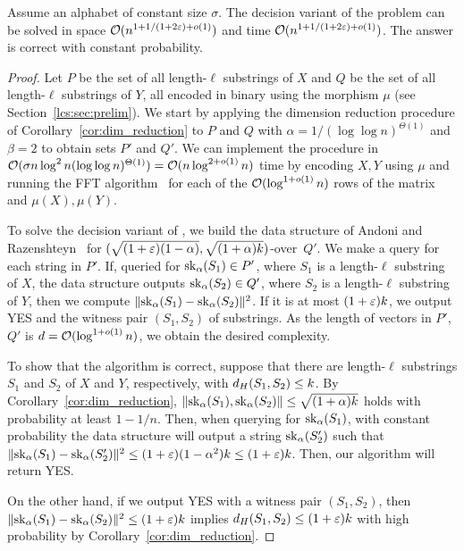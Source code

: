 \begin{lemma}\label{lm:opt_NN}
Assume an alphabet of constant size $\sigma$. The decision variant of the \kApproxLCS problem can be solved in space $\mathcal{O}(n^{1+ 1/(1+2\varepsilon) + o(1)})$ and time $\mathcal{O}(n^{1+ 1/(1+2\varepsilon) + o(1)})$. The answer is correct with constant probability. 
\end{lemma}
\begin{proof}
Let $P$ be the set of all length-$\ell$ substrings of $X$ and $Q$ be the set of all length-$\ell$ substrings of $Y$,
all encoded in binary using the morphism $\mu$ (see Section~\ref{lcs:sec:prelim}). We start by applying the dimension reduction procedure of Corollary~\ref{cor:dim_reduction} to $P$ and $Q$ with $\alpha = 1/(\log\log n)^{\Theta(1)}$ and $\beta = 2$ to obtain sets $P'$ and $Q'$. We can implement the procedure in $\mathcal{O}(\sigma n \log^2 n (\log\log n)^{\Theta(1)}) = \mathcal{O}(n \log^{2+o(1)} n)$ time by encoding $X, Y$ using $\mu$ and running the FFT algorithm~\cite{FischerPaterson} for each of the $\mathcal{O}(\log^{1+o(1)} n)$ rows of the matrix and $\mu(X), \mu(Y)$. 

To solve the decision variant of \kApproxLCS, we build the data structure of Andoni and Razenshteyn~\cite{DBLP:conf/stoc/AndoniR15} for $(\sqrt{(1+\varepsilon)(1-\alpha)}, \sqrt{(1+\alpha)k})$-\NN over~$Q'$. We make a query for each string in $P'$. If, queried for $\mathrm{sk}_{\alpha}(S_1)\in P'$, where $S_1$ is a length-$\ell$ substring of $X$, the data structure outputs $\mathrm{sk}_{\alpha}(S_2)\in Q'$, where $S_2$ is a length-$\ell$ substring of $Y$, then we compute $\lVert\mathrm{sk}_{\alpha}(S_1)- \mathrm{sk}_{\alpha}(S_2)\rVert^2$. If it is at most $(1+\varepsilon)k$, we output YES and the witness pair $(S_1,S_2)$ of substrings. As the length of vectors in $P'$, $Q'$ is $d = \mathcal{O}(\log^{1+o(1)} n)$, we obtain the desired complexity. 

To show that the algorithm is correct, suppose that there are length-$\ell$ substrings $S_1$ and $S_2$ of $X$ and $Y$, respectively, with $d_H(S_1, S_2) \le k$. By Corollary~\ref{cor:dim_reduction}, $\lVert\mathrm{sk}_\alpha(S_1),\mathrm{sk}_\alpha(S_2)\rVert\le \sqrt{(1+\alpha)k}$ holds with probability at least $1-1/n$. Then, when querying for $\mathrm{sk}_\alpha(S_1)$, with constant probability the data structure will output a string $\mathrm{sk}_\alpha(S'_2)$ such that $\lVert\mathrm{sk}_\alpha(S_1) - \mathrm{sk}_\alpha(S'_2)\rVert^2 \le (1+\varepsilon)(1-\alpha^2) k \le (1+\varepsilon) k$. Then, our algorithm will return YES. 

On the other hand, if we output YES with a witness pair $(S_1,S_2)$, then $\lVert\mathrm{sk}_\alpha(S_1) - \mathrm{sk}_\alpha(S_2)\rVert^2\le (1+\varepsilon)k$ implies $d_H(S_1,S_2)\le (1+\varepsilon)k$ with high probability by Corollary~\ref{cor:dim_reduction}.
\end{proof}

